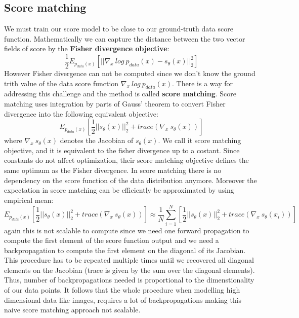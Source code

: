\documentclass{article}
\begin{document}
	\subsection{Score matching}
	We must train our score model to be close to our ground-truth data score function. Mathematically we can capture the distance between the two vector fields of score by the \textbf{Fisher divergence objective}:
	\begin{equation}
	\frac{1}{2}E_{p_{data}(x)}[||\nabla_{x}\ log\ p_{data}(x) - s_{\theta}(x) ||_{2}^{2}]
	\end{equation}		
	However Fisher divergence can not be computed since we don't know the ground trith value of the data score function $\nabla_{x}\ log\ p_{data}(x)$. There is a way for addressing this challenge and the method is called \textbf{score matching}. Score matching uses integration by parts of Gauss' theorem to convert Fisher divergence into the following equivalent objective:
	\begin{equation}
	E_{p_{data}(x)}[\frac{1}{2}||s_{\theta}(x)||_{2}^{2} + trace(\nabla_{x}\ s_{\theta}(x))]
	\end{equation}
	where $\nabla_{x}\ s_{\theta}(x)$ denotes the Jacobian of $s_{\theta}(x)$. We call it score matching objective, and it is equivalent to the fisher divergence up to a costant. Since constants do not affect optimization, their score matching objective defines the same optimum as the Fisher divergence. In score matching there is no dependency on the score function of the data distribution anymore. Moreover the expectation in score matching can be efficiently be approximated by using empirical mean:
	\begin{equation}
	E_{p_{data}(x)}[\frac{1}{2}||s_{\theta}(x)||_{2}^{2} + trace(\nabla_{x}\ s_{\theta}(x))] \approx \frac{1}{N} \sum_{i=1}^{N}[\frac{1}{2}||s_{\theta}(x)||_{2}^{2} + trace(\nabla_{x}\ s_{\theta}(x_i))]
	\end{equation}
	again this is not scalable to compute since we need one forward propagation to compute the first element of the score function output and we need a backpropagation to compute the first element on the diagonal of its Jacobian. This procedure has to be repeated multiple times until we recovered all diagonal elements on the Jacobian (trace is given by the sum over the diagonal elements). Thus, number of backpropagations needed is proportional to the dimenstionality of our data points. It follows that the whole procedure when modelling high dimensional data like images, requires a lot of backpropagations making this naive score matching approach not scalable.
\end{document}
